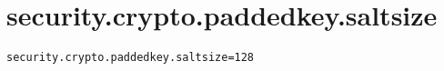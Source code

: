 \section{security.crypto.paddedkey.saltsize}
\label{configuration:SecurityCryptoPaddedkeySaltsize}
\ClearAPI
\TODO
{}
\begin{lstlisting}[style=Props,caption={Usage example for \textit{security.crypto.paddedkey.saltsize}}]
security.crypto.paddedkey.saltsize=128
\end{lstlisting}